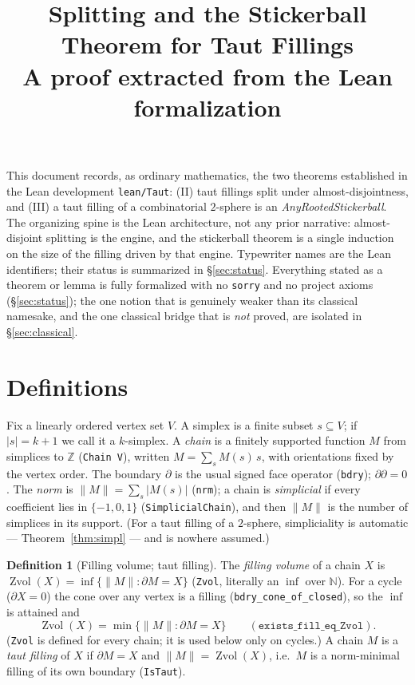 \documentclass[11pt]{article}
\title{Splitting and the Stickerball Theorem for Taut Fillings\\[2pt]
\large A proof extracted from the Lean formalization}
\author{}
\date{}
\theoremstyle{plain}
\theoremstyle{definition}
\newtheorem{definition}[theorem]{Definition}
\theoremstyle{remark}
\newcommand{\Zvol}{\operatorname{Zvol}}
\newcommand{\bd}{\partial}
\newcommand{\Z}{\mathbb{Z}}
\newcommand{\code}[1]{\texttt{#1}}
\newcommand{\card}[1]{\lvert #1\rvert}
\newcommand{\norm}[1]{\lVert #1\rVert}
\begin{document}
\maketitle

\noindent
This document records, as ordinary mathematics, the two theorems established in the Lean
development \code{lean/Taut}: (II) taut fillings split under almost-disjointness, and
(III) a taut filling of a combinatorial $2$-sphere is an \emph{AnyRootedStickerball}.
The organizing spine is the Lean architecture, not any prior narrative: almost-disjoint
splitting is the engine, and the stickerball theorem is a single induction on the size of
the filling driven by that engine. Typewriter names are the Lean identifiers; their status
is summarized in \S\ref{sec:status}. Everything stated as a theorem or lemma is fully
formalized with no \code{sorry} and no project axioms (\S\ref{sec:status}); the one notion
that is genuinely weaker than its classical namesake, and the one classical bridge that is
\emph{not} proved, are isolated in \S\ref{sec:classical}.

\section{Definitions}\label{sec:defs}

Fix a linearly ordered vertex set $V$. A simplex is a finite subset $s\subseteq V$; if
$\card{s}=k+1$ we call it a $k$-simplex. A \emph{chain} is a finitely supported function
$M$ from simplices to $\Z$ (\code{Chain V}), written $M=\sum_s M(s)\,s$, with orientations
fixed by the vertex order. The boundary $\bd$ is the usual signed face operator
(\code{bdry}); $\bd\bd=0$. The \emph{norm} is $\norm{M}=\sum_s\card{M(s)}$ (\code{nrm}); a
chain is \emph{simplicial} if every coefficient lies in $\{-1,0,1\}$
(\code{SimplicialChain}), and then $\norm{M}$ is the number of simplices in its support. (For a
taut filling of a $2$-sphere, simpliciality is automatic --- Theorem~\ref{thm:simpl} --- and is
nowhere assumed.)

\begin{definition}[Filling volume; taut filling]\label{def:taut}
The \emph{filling volume} of a chain $X$ is $\Zvol(X)=\inf\{\norm{M}:\bd M=X\}$ (\code{Zvol},
literally an $\inf$ over $\mathbb N$). For a cycle ($\bd X=0$) the cone over any vertex is a filling
(\code{bdry\_cone\_of\_closed}), so the $\inf$ is attained and
\[
\Zvol(X)=\min\{\norm{M}:\bd M=X\}\qquad(\code{exists\_fill\_eq\_Zvol}).
\]
(\code{Zvol} is defined for every chain; it is used below only on cycles.)
A chain $M$ is a \emph{taut filling} of $X$ if $\bd M=X$ and $\norm{M}=\Zvol(X)$, i.e.\ $M$
is a norm-minimal filling of its own boundary (\code{IsTaut}).
\end{definition}
\end{document}
